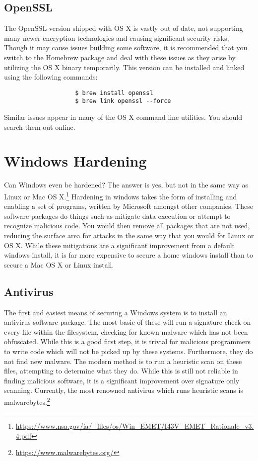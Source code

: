 			\subsection{OpenSSL}
				The OpenSSL version shipped with OS X is vastly out of date, not supporting many newer encryption technologies and causing significant security risks.
				Though it may cause issues building some software, it is recommended that you switch to the Homebrew package and deal with these issues as they arise by utilizing the OS X binary temporarily.
				This version can be installed and linked using the following commands:
				\begin{verbatim}
					$ brew install openssl
					$ brew link openssl --force
				\end{verbatim}
				Similar issues appear in many of the OS X command line utilities.
				You should search them out online.
	\section{Windows Hardening}
		Can Windows even be hardened? The answer is yes, but not in the same way as Linux or Mac OS X.\footnote{\url{https://www.nsa.gov/ia/\_files/os/Win\_EMET/I43V\_EMET\_Rationale\_v3.4.pdf}}
		Hardening in windows takes the form of installing and enabling a set of programs, written by Microsoft amongst other companies.
		These software packages do things such as mitigate data execution or attempt to recognize malicious code.
		You would then remove all packages that are not used, reducing the surface area for attacks in the same way that you would for Linux or OS X.
		While these mitigations are a significant improvement from a default windows install, it is far more expensive to secure a home windows install than to secure a Mac OS X or Linux install.
		\subsection{Antivirus}
			The first and easiest means of securing a Windows system is to install an antivirus software package.
			The most basic of these will run a signature check on every file within the filesystem, checking for known malware which has not been obfuscated.
			While this is a good first step, it is trivial for malicious programmers to write code which will not be picked up by these systems.
			Furthermore, they do not find new malware.
			The modern method is to run a heuristic scan on these files, attempting to determine what they do.
			While this is still not reliable in finding malicious software, it is a significant improvement over signature only scanning.
			Currently, the most renowned antivirus which runs heuristic scans is malwarebytes.\footnote{\url{https://www.malwarebytes.org/}}

